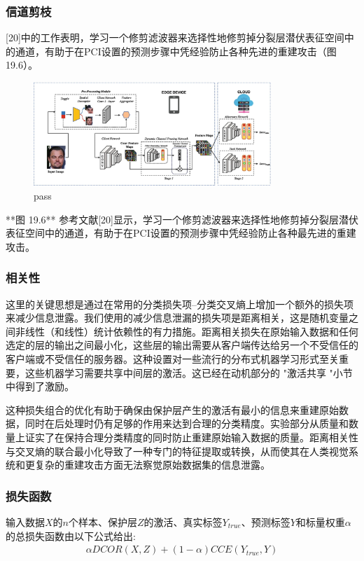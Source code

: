 \subsubsection{信道剪枝}
[20]中的工作表明，学习一个修剪滤波器来选择性地修剪掉分裂层潜伏表征空间中的通道，有助于在PCI设置的预测步骤中凭经验防止各种先进的重建攻击（图19.6）。
\begin{figure}
	\centering
	\includegraphics[width=0.8\textwidth]{chapter19/images/Fig.19.6}
	\caption{pass} \label{fig:19.6}
\end{figure}
**图 19.6** 参考文献[20]显示，学习一个修剪滤波器来选择性地修剪掉分裂层潜伏表征空间中的通道，有助于在PCI设置的预测步骤中凭经验防止各种最先进的重建攻击。

\subsubsection{相关性}
这里的关键思想是通过在常用的分类损失项--分类交叉熵上增加一个额外的损失项来减少信息泄露。我们使用的减少信息泄漏的损失项是距离相关，这是随机变量之间非线性（和线性）统计依赖性的有力措施。距离相关损失在原始输入数据和任何选定的层的输出之间最小化，这些层的输出需要从客户端传达给另一个不受信任的客户端或不受信任的服务器。这种设置对一些流行的分布式机器学习形式至关重要，这些机器学习需要共享中间层的激活。这已经在动机部分的 "激活共享 "小节中得到了激励。

这种损失组合的优化有助于确保由保护层产生的激活有最小的信息来重建原始数据，同时在后处理时仍有足够的作用来达到合理的分类精度。实验部分从质量和数量上证实了在保持合理分类精度的同时防止重建原始输入数据的质量。距离相关性与交叉熵的联合最小化导致了一种专门的特征提取或转换，从而使其在人类视觉系统和更复杂的重建攻击方面无法察觉原始数据集的信息泄露。

\subsubsection{损失函数}
输入数据$X$的$n$个样本、保护层$Z$的激活、真实标签$Y_{true}$、预测标签$Y$和标量权重$\alpha$的总损失函数由以下公式给出:
\begin{align}
	\alpha DCOR(X, Z) + (1 - \alpha) CCE(Y_{true}, Y)
\end{align}

